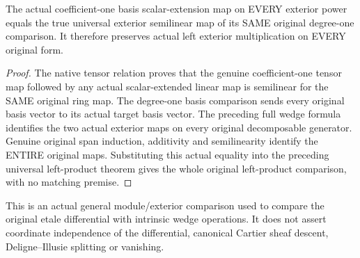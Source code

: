 \begin{theorem}
\label{lem:cartier-exterior-basis-universal-map}
\leanok
The actual coefficient-one basis scalar-extension map on EVERY exterior
power equals the true universal exterior semilinear map of its SAME original
degree-one comparison. It therefore preserves actual left exterior
multiplication on EVERY original form.
\end{theorem}
\begin{proof}
The native tensor relation proves that the genuine coefficient-one tensor
map followed by any actual scalar-extended linear map is semilinear for the
SAME original ring map. The degree-one basis comparison sends every
original basis vector to its actual target basis vector.
The preceding full wedge formula identifies the two actual exterior maps
on every original decomposable generator. Genuine original span induction,
additivity and semilinearity identify the ENTIRE original maps. Substituting
this actual equality into the preceding universal left-product theorem
gives the whole original left-product comparison, with no matching premise.
\end{proof}

This is an actual general module/exterior comparison used to compare the
original etale differential with intrinsic wedge operations. It does not
assert coordinate independence of the differential, canonical Cartier sheaf
descent, Deligne--Illusie splitting or vanishing.
